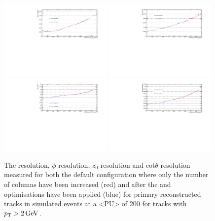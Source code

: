 \begin{figure}[htb]
\centering
\includegraphics[width=0.49\textwidth]{figs/tk-upgrade/results-lowPtTracking/qOverPtResVsInvPtFlatGeometry_5000.pdf}
\includegraphics[width=0.49\textwidth]{figs/tk-upgrade/results-lowPtTracking/phi0ResVsInvPtFlatGeometry_5000.pdf}
\\
\includegraphics[width=0.49\textwidth]{figs/tk-upgrade/results-lowPtTracking/z0ResVsInvPtFlatGeometry_5000.pdf}
\includegraphics[width=0.49\textwidth]{figs/tk-upgrade/results-lowPtTracking/cotThetaResVsInvPtFlatGeometry_5000.pdf}
\caption{
The \pt resolution, $\phi$ resolution, $z_{0}$ resolution and cot$\theta$ resolution measured for both the default configuration where only the number of \HT \qpt columns have been increased (red) and after the \HT and \KF optimisations have been applied (blue) for primary reconstructed tracks in simulated \ttbar events at a <PU> of 200 for tracks with $p_{\mathrm{T}} > 2\,\text{Ge\hspace{-.08em}V}$.
}
\label{fig:htHelixParametersResVsInvPt}
\end{figure}

